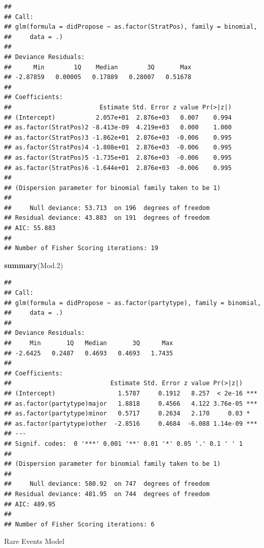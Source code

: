 \documentclass[
]{article}
\newenvironment{Shaded}{\begin{snugshade}}{\end{snugshade}}
\newcommand{\FloatTok}[1]{\textcolor[rgb]{0.00,0.00,0.81}{#1}}
\newcommand{\KeywordTok}[1]{\textcolor[rgb]{0.13,0.29,0.53}{\textbf{#1}}}
\newcommand{\NormalTok}[1]{#1}
\newcommand{\OperatorTok}[1]{\textcolor[rgb]{0.81,0.36,0.00}{\textbf{#1}}}
\begin{document}
\begin{verbatim}
## 
## Call:
## glm(formula = didPropose ~ as.factor(StratPos), family = binomial, 
##     data = .)
## 
## Deviance Residuals: 
##      Min        1Q    Median        3Q       Max  
## -2.87859   0.00005   0.17889   0.28007   0.51678  
## 
## Coefficients:
##                        Estimate Std. Error z value Pr(>|z|)
## (Intercept)           2.057e+01  2.876e+03   0.007    0.994
## as.factor(StratPos)2 -8.413e-09  4.219e+03   0.000    1.000
## as.factor(StratPos)3 -1.862e+01  2.876e+03  -0.006    0.995
## as.factor(StratPos)4 -1.808e+01  2.876e+03  -0.006    0.995
## as.factor(StratPos)5 -1.735e+01  2.876e+03  -0.006    0.995
## as.factor(StratPos)6 -1.644e+01  2.876e+03  -0.006    0.995
## 
## (Dispersion parameter for binomial family taken to be 1)
## 
##     Null deviance: 53.713  on 196  degrees of freedom
## Residual deviance: 43.883  on 191  degrees of freedom
## AIC: 55.883
## 
## Number of Fisher Scoring iterations: 19
\end{verbatim}

\begin{Shaded}
\begin{Highlighting}[]
\KeywordTok{summary}\NormalTok{(Mod}\FloatTok{.2}\NormalTok{)}
\end{Highlighting}
\end{Shaded}

\begin{verbatim}
## 
## Call:
## glm(formula = didPropose ~ as.factor(partytype), family = binomial, 
##     data = .)
## 
## Deviance Residuals: 
##     Min       1Q   Median       3Q      Max  
## -2.6425   0.2487   0.4693   0.4693   1.7435  
## 
## Coefficients:
##                           Estimate Std. Error z value Pr(>|z|)    
## (Intercept)                 1.5787     0.1912   8.257  < 2e-16 ***
## as.factor(partytype)major   1.8818     0.4566   4.122 3.76e-05 ***
## as.factor(partytype)minor   0.5717     0.2634   2.170     0.03 *  
## as.factor(partytype)other  -2.8516     0.4684  -6.088 1.14e-09 ***
## ---
## Signif. codes:  0 '***' 0.001 '**' 0.01 '*' 0.05 '.' 0.1 ' ' 1
## 
## (Dispersion parameter for binomial family taken to be 1)
## 
##     Null deviance: 580.92  on 747  degrees of freedom
## Residual deviance: 481.95  on 744  degrees of freedom
## AIC: 489.95
## 
## Number of Fisher Scoring iterations: 6
\end{verbatim}

Rare Events Model

\begin{Shaded}
\end{Shaded}
\end{document}
